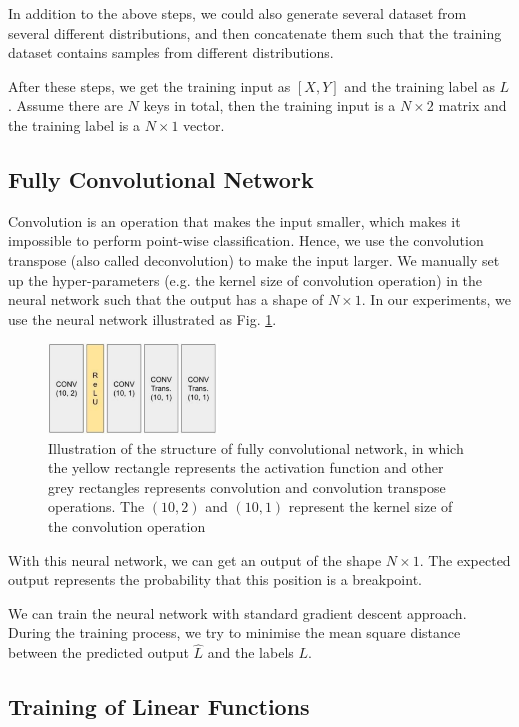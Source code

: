 In addition to the above steps, we could also generate several dataset from several different distributions, and then concatenate them such that the training dataset contains samples from different distributions.

After these steps, we get the training input as $[X, Y]$ and the training label as $L$. Assume there are $N$ keys in total, then the training input is a $N\times 2$ matrix and the training label is a $N\times 1$ vector.

\subsection{Fully Convolutional Network}

Convolution is an operation that makes the input smaller, which makes it impossible to perform point-wise classification. Hence, we use the convolution transpose (also called deconvolution) to make the input larger. We manually set up the hyper-parameters (e.g. the kernel size of convolution operation) in the neural network such that the output has a shape of $N\times 1$. In our experiments, we use the neural network illustrated as Fig. \ref{fig:5_fcn}.

\begin{figure}
\centering
\includegraphics[width=0.4\textwidth]{graphs/fcn/fcn.pdf}
\caption{Illustration of the structure of fully convolutional network, in which the yellow rectangle represents the activation function and other grey rectangles represents convolution and convolution transpose operations. The $(10, 2)$ and $(10, 1)$ represent the kernel size of the convolution operation}
\label{fig:5_fcn}
\end{figure}

With this neural network, we can get an output of the shape $N\times 1$. The expected output represents the probability that this position is a breakpoint.

We can train the neural network with standard gradient descent approach. During the training process, we try to minimise the mean square distance between the predicted output $\hat{L}$ and the labels $L$.


\subsection{Training of Linear Functions}

